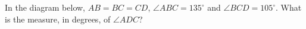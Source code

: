 In the diagram below, $AB=BC=CD$, $\angle ABC = 135^\circ$ and $\angle BCD = 105^\circ$. What is the measure, in degrees, of $\angle ADC$?
